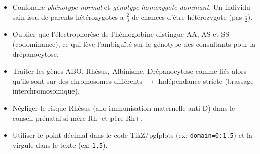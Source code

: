\documentclass[11pt]{article}
\begin{document}
\begin{attention}
\begin{itemize}
    \item Confondre \emph{phénotype normal} et \emph{génotype homozygote dominant}. Un individu sain issu de parents hétérozygotes a $\frac{2}{3}$ de chances d'être hétérozygote (pas $\frac{1}{2}$).
    \item Oublier que l'électrophorèse de l'hémoglobine distingue AA, AS et SS (codominance), ce qui lève l'ambiguïté sur le génotype des consultants pour la drépanocytose.
    \item Traiter les gènes ABO, Rhésus, Albinisme, Drépanocytose comme liés alors qu'ils sont sur des chromosomes différents $\rightarrow$ Indépendance stricte (brassage interchromosomique).
    \item Négliger le risque Rhésus (allo-immunisation maternelle anti-D) dans le conseil prénatal si mère Rh- et père Rh+.
    \item Utiliser le point décimal dans le code TikZ/pgfplots (ex: \texttt{domain=0:1.5}) et la virgule dans le texte (ex: \texttt{1,5}).
\end{itemize}
\end{attention}
\end{document}
